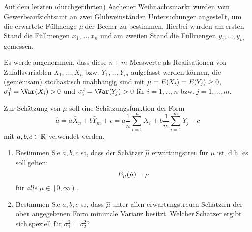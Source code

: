 \documentclass{exercise}
\begin{document}
    \begin{problem}
        Auf dem letzten (durchgeführten) Aachener Weihnachtsmarkt wurden vom Gewerbeaufsichtsamt an zwei Glühweinständen Untersuchungen angestellt, um die erwartete Füllmenge \(\mu\) der Becher zu bestimmen.
        Hierbei wurden am ersten Stand die Füllmengen \(x_1, \ldots, x_n\) und am zweiten Stand die Füllmengen \(y_1, \ldots, y_m\) gemessen.
        
        Es werde angenommen, dass diese \(n + m\) Messwerte als Realisationen von Zufallsvariablen \(X_1, \ldots, X_n\) bzw. \(Y_1, \ldots, Y_m\) aufgefasst werden können, die (gemeinsam) stochastisch unabhängig sind mit \(\mu = E\parentheses*{X_i} = E\parentheses*{Y_j} \ge 0\), \(\sigma_1^2 = \Var\parentheses*{X_i} > 0\) und \(\sigma_2^2 = \Var\parentheses*{Y_j} > 0\) für \(i = 1, \ldots, n\) bzw. \(j = 1, \ldots, m\).
        
        Zur Schätzung von \(\mu\) soll eine Schätzungsfunktion der Form
        \[
            \hat{\mu} = a\bar{X}_n + b\bar{Y}_m + c = a\frac{1}{n}\sum_{i = 1}^n X_i + b\frac{1}{m}\sum_{i = 1}^m Y_j + c
        \]
        mit \(a, b, c \in \mathbb{R}\) verwendet werden.
        \begin{enumerate}
            \item Bestimmen Sie \(a, b, c\) so, dass der Schätzer \(\hat{\mu}\) erwartungstreu für \(\mu\) ist, d.h. es soll gelten:
            \[
            E_{\mu}\parentheses*{\hat{\mu}} = \mu
            \]
            für \emph{alle} \(\mu \in \left[0, \infty\right)\).
            \item Bestimmen Sie \(a, b, c\) so, dass \(\hat{\mu}\) unter allen erwartungstreuen Schätzern der oben angegebenen Form minimale Varianz besitzt.
            Welcher Schätzer ergibt sich speziell für \(\sigma_1^2 = \sigma_2^2\)?
        \end{enumerate}
    \end{problem}
    
\end{document}
